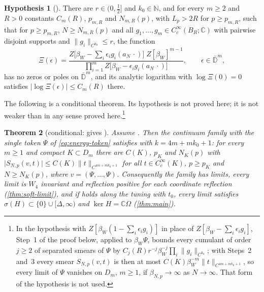\documentclass[11pt,a4paper]{amsart}
\newtheorem{theorem}{Theorem}[section]
\theoremstyle{definition}
\newtheorem{hypothesis}[theorem]{Hypothesis}
\theoremstyle{remark}
\numberwithin{equation}{section}
\newcommand{\C}{\mathbb{C}}          %
\newcommand{\Nat}{\mathbb{N}}        %
\newcommand{\norm}[1]{\lVert #1\rVert}     %
\newcommand{\abs}[1]{\lvert #1\rvert}      %
\newcommand{\Mcirc}{\text{\upshape(M$^{\circ}$)}}   %
\newcommand{\UVB}{\text{\upshape(UVB)}}             %
\newcommand{\San}{\text{\upshape(S$'_{\mathrm{an}}$)}} %
\newcommand{\aN}{a_N}                      %
\newcommand{\tzero}{t_0}                   %
\newcommand{\Lp}{L_p}                      %
\newcommand{\betaNp}{\beta_{N,p}}          %
\newcommand{\betaW}{\beta_{W}}             %
\begin{document}
\begin{hypothesis}[\San]
There are $r\in(0,\frac12]$ and $k_0\in\Nat$, and for every $m\ge2$ and $R>0$ constants $C_m(R)$, $p_{m,R}$ and $N_{m,R}(p)$, with $\Lp>2R$ for $p\ge p_{m,R}$, such that for $p\ge p_{m,R}$, $N\ge N_{m,R}(p)$ and all $g_1,\dots,g_m\in C^\infty_c(B_R;\C)$ with pairwise disjoint supports and $\norm{g_i}_{C^{k_0}}\le r$, the function
\[
\Xi(\epsilon)=\frac{Z\bigl[\betaW-\sum_i\epsilon_ig_i(\aN\,\cdot)\bigr]\;Z[\betaW]^{m-1}}{\prod_{i=1}^mZ\bigl[\betaW-\epsilon_ig_i(\aN\,\cdot)\bigr]},\qquad\epsilon\in\bar{\mathbb D}^m,
\]
has no zeros or poles on $\bar{\mathbb D}^m$, and its analytic logarithm with $\log\Xi(0)=0$ satisfies $\abs{\log\Xi(\epsilon)}\le C_m(R)$ there.
\end{hypothesis}

The following is a conditional theorem. Its hypothesis \San{} is not proved here; it is not weaker than \Mcirc{} in any sense proved here.\footnote{In the hypothesis with $Z[\betaW(1-\sum_i\epsilon_ig_i)]$ in place of $Z[\betaW-\sum_i\epsilon_ig_i]$, Step~1 of the proof below, applied to $\betaW\Psi$, bounds every cumulant of order $j\ge2$ of separated smears of $\Psi$ by $C_j(R)r^{-j}\betaW^{-j}\prod_i\norm{g_i}_{C^{k_0}}$; with Steps~2 and~3 every smear $S_{N,p}(v,t)$ is then at most $C(K)\betaW^{-m}\norm{t}_{C^{4m+mk_0+1}}$, so every limit of $\Psi$ vanishes on $D_m$, $m\ge1$, if $\betaNp\to\infty$ as $N\to\infty$. That form of the hypothesis is not used.}

\begin{theorem}[conditional: \San{} gives \UVB]\label{thm:San-UVB}
Assume \San. Then the continuum family with the single token $\Psi$ of \eqref{eq:energy-token} satisfies \UVB{} with $k=4m+mk_0+1$: for every $m\ge1$ and compact $K\subset D_m$ there are $C(K)$, $p_K$ and $N_K(p)$ with $\abs{S_{N,p}(v,t)}\le C(K)\norm{t}_{C^{4m+mk_0+1}}$ for all $t\in C^\infty_c(K)$, $p\ge p_K$ and $N\ge N_K(p)$, where $v=(\Psi,\dots,\Psi)$. Consequently the family has limits, every limit is $W_4$ invariant and reflection positive for each coordinate reflection (\cref{thm:soft-limit}), and if \Mcirc{} holds along the tuning with $\tzero$, every limit satisfies $\sigma(H)\subset\{0\}\cup[\Delta,\infty)$ and $\ker H=\C\Omega$ (\cref{thm:main}).
\end{theorem}
\end{document}
